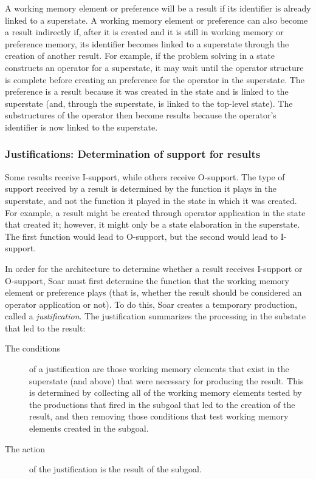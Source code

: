A working memory element or preference will be a result if
its identifier is already linked to a superstate.
A working memory element or preference can also become a result
indirectly if, after it is created and it is still in working memory or
preference memory, its identifier becomes linked to a superstate through
the creation of another result. For example, if the problem solving in a
state constructs an operator for a superstate, it may wait until
the operator structure is complete before creating an
 preference for the operator in the superstate. The
 preference is a result because it was created in the
state and is linked to the superstate (and, through the superstate, is
linked to the top-level state). The substructures of the operator then
become results because the operator's identifier is now linked to the
superstate. 

\subsubsection*{Justifications: Determination of support for results}

Some results receive I-support, while others receive O-support.  The
type of support received by a result is determined by the function it
plays in the superstate, and not the function it played in the state in
which it was created. For example, a result might be created through
operator application in the state that created it; however, it might
only be a state elaboration in the superstate. The first function would
lead to O-support, but the second would lead to I-support.

In order for the architecture to determine whether a result receives I-support
or O-support, Soar must first determine the function that the working
memory element or preference plays
(that is, whether the result should be considered an operator application or
not). To do this, Soar creates a temporary production, called a
\textit{justification}. The justification summarizes the processing in the
substate that led to the result:\vspace{-10pt}
\begin{description}
\item[The conditions] of a justification are those working memory
elements that exist in the superstate (and above) that were necessary
for producing the result.  This is determined by collecting all of the
working memory elements tested by the productions that fired in the
subgoal that led to the creation of the result, and then removing those
conditions that test working memory elements created in the subgoal.
\vspace{-6pt}
\item[The action] of the justification is the result of the subgoal.
\end{description} 

